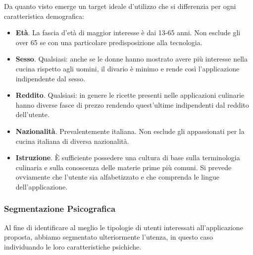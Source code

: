 Da quanto visto emerge un target ideale d'utilizzo che si differenzia per ogni
caratteristica demografica:
\begin{itemize}
\item \textbf{Età}. La fascia d'età di maggior interesse è dai 13-65
anni. Non esclude gli over 65 se con una particolare predisposizione
alla tecnologia.
\item \textbf{Sesso}. Qualsiasi: anche se le donne hanno mostrato avere più
interesse nella cucina rispetto agli uomini, il divario è minimo e rende
così l'applicazione indipendente dal sesso.
\item \textbf{Reddito}. Qualsiasi:
in genere le ricette presenti nelle applicazioni culinarie hanno diverse
fasce di prezzo rendendo quest'ultime indipendenti dal reddito dell'utente.
\item \textbf{Nazionalità}. Prevalentemente italiana. Non esclude gli
appassionati per la cucina italiana di diversa nazionalità.
\item \textbf{Istruzione}. È sufficiente possedere una cultura di base sulla terminologia
culinaria e sulla conoscenza delle materie prime più comuni. Si prevede
ovviamente che l'utente sia alfabetizzato e che comprenda le lingue
dell'applicazione. 

\end{itemize}

\subsubsection{Segmentazione Psicografica}
Al fine di identificare al meglio le tipologie di
utenti interessati all'applicazione proposta, abbiamo segmentato
ulteriormente l'utenza, in questo caso individuando le loro caratteristiche
psichiche.


